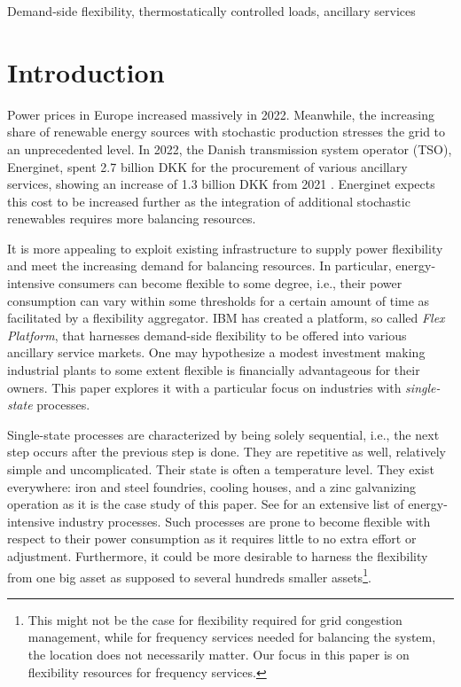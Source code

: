 \documentclass[conference]{IEEEtran}
\begin{document}
\vspace{1mm}
\begin{IEEEkeywords}
    Demand-side flexibility, thermostatically controlled loads, ancillary services
\end{IEEEkeywords}

\section{Introduction}
\vspace{-1mm}
Power prices in Europe increased massively in 2022. Meanwhile, the increasing share of renewable energy sources with stochastic production stresses the grid to an unprecedented level. In 2022, the Danish transmission system operator (TSO), Energinet, spent 2.7 billion DKK for the procurement of various ancillary services, showing an increase of 1.3 billion DKK from 2021 \cite{energinetOmkostninger}. Energinet expects this cost to be increased further as the integration of additional stochastic renewables requires more balancing resources.

It is more appealing to exploit existing infrastructure to supply power flexibility and  meet the increasing demand for balancing resources. In particular, energy-intensive consumers can become flexible to some degree, i.e., their power consumption can vary within some thresholds for a certain amount of time as facilitated by a flexibility aggregator. IBM has created a platform, so called \textit{Flex Platform}, that harnesses demand-side flexibility to be offered into various ancillary service markets. One may hypothesize a modest investment making industrial plants  to some extent flexible is financially advantageous for their owners. This paper explores it with a particular focus on industries with \textit{single-state} processes. 

Single-state processes are characterized by being solely sequential, i.e., the next step occurs after the previous step is done. They are repetitive as well, relatively simple and uncomplicated. Their state is often a temperature level. They exist everywhere: iron and steel foundries, cooling houses, and a zinc galvanizing operation as it is the case study of this paper. See \cite{paulus2011potential} for an extensive list of energy-intensive industry processes. Such processes are prone to become flexible with respect to their power consumption as it requires little to no extra effort or adjustment. Furthermore, it could be more desirable to harness the flexibility from one big asset as supposed to several hundreds smaller assets\footnote{This might not be the case for flexibility required for grid congestion management, while for frequency services needed for balancing the system, the location does not necessarily matter. Our focus in this paper is on flexibility resources for frequency services.}.
\end{document}
